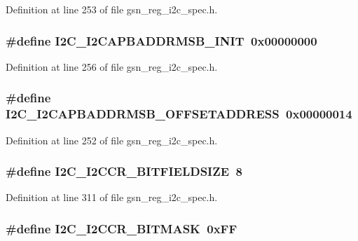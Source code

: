 Definition at line 253 of file gsn\_\-reg\_\-i2c\_\-spec.h.

\hypertarget{a00558_a0f2f1cebf888bd0d6d2f5d0b76259af5}{
\subsubsection[{I2C\_\-I2CAPBADDRMSB\_\-INIT}]{\setlength{\rightskip}{0pt plus 5cm}\#define I2C\_\-I2CAPBADDRMSB\_\-INIT~0x00000000}}
\label{a00558_a0f2f1cebf888bd0d6d2f5d0b76259af5}


Definition at line 256 of file gsn\_\-reg\_\-i2c\_\-spec.h.

\hypertarget{a00558_a5777253e1faa622ad5ad42402fc4a0e5}{
\subsubsection[{I2C\_\-I2CAPBADDRMSB\_\-OFFSETADDRESS}]{\setlength{\rightskip}{0pt plus 5cm}\#define I2C\_\-I2CAPBADDRMSB\_\-OFFSETADDRESS~0x00000014}}
\label{a00558_a5777253e1faa622ad5ad42402fc4a0e5}


Definition at line 252 of file gsn\_\-reg\_\-i2c\_\-spec.h.

\hypertarget{a00558_ad4c3103d48702ae4c190be876772b27c}{
\subsubsection[{I2C\_\-I2CCR\_\-BITFIELDSIZE}]{\setlength{\rightskip}{0pt plus 5cm}\#define I2C\_\-I2CCR\_\-BITFIELDSIZE~8}}
\label{a00558_ad4c3103d48702ae4c190be876772b27c}


Definition at line 311 of file gsn\_\-reg\_\-i2c\_\-spec.h.

\hypertarget{a00558_abc30e516bb763d42f659631a6b7d9b9f}{
\subsubsection[{I2C\_\-I2CCR\_\-BITMASK}]{\setlength{\rightskip}{0pt plus 5cm}\#define I2C\_\-I2CCR\_\-BITMASK~0xFF}}
\label{a00558_abc30e516bb763d42f659631a6b7d9b9f}


